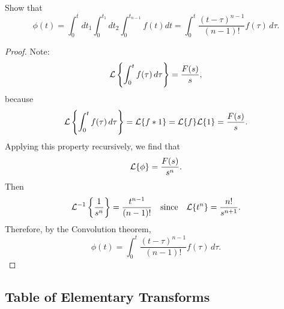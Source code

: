 \begin{eg}
	Show that 
	\[
	\phi(t) = \int_0^t dt_1 \int_0^{t_1} dt_2 \int_0^{t_{n-1}} f(t) dt = \int_0^t \frac{(t-\tau)^{n-1}}{(n-1)!} f(\tau)\,d\tau.
	\]
\end{eg}
\begin{proof}
	Note: 
	\[
	\mathcal{L}\left\{\int_0^t f(\tau)\,d\tau\right\} = \frac{F(s)}{s},
	\]
	because 
	\[
	\mathcal{L}\left\{\int_0^t f(\tau)\,d\tau\right\} = \mathcal{L}\{f*1\} = \mathcal{L}\{f\}\mathcal{L}\{1\} = \frac{F(s)}{s}.
	\]
	Applying this property recursively, we find that
	\[
	\mathcal{L}\{\phi\} = \frac{F(s)}{s^n}.
	\]
	Then
	\[
	\mathcal{L}^{-1}\left\{\frac{1}{s^n}\right\} = \frac{t^{n-1}}{(n-1)!} \quad\text{since}\quad \mathcal{L}\{t^n\} = \frac{n!}{s^{n+1}}.
	\]
	Therefore, by the Convolution theorem, 
	\[
	\phi(t) = \int_0^t \frac{(t-\tau)^{n-1}}{(n-1)!} f(\tau)\,d\tau.
	\]
\end{proof}

\pagebreak
\subsection{Table of Elementary Transforms}\label{sec:laptable}

